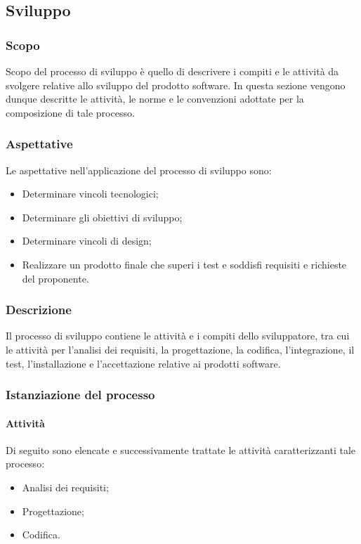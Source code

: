 \vspace{2cm}

\subsection{Sviluppo} \label{subsection:Sviluppo}
\subsubsection{Scopo} \label{subsubsection:Sviluppo_Scopo}
Scopo del processo di sviluppo è quello di descrivere i compiti e le attività da svolgere relative allo sviluppo del prodotto software.
In questa sezione vengono dunque descritte le attività, le norme e le convenzioni adottate per la composizione di tale processo.

\subsubsection{Aspettative} \label{subsubsection:Sviluppo_Aspettative}
Le aspettative nell'applicazione del processo di sviluppo sono:
\begin{itemize}
    \item Determinare vincoli tecnologici;
    \item Determinare gli obiettivi di sviluppo;
    \item Determinare vincoli di design;
    \item Realizzare un prodotto finale che superi i test e soddisfi requisiti e richieste del proponente.
\end{itemize}

\subsubsection{Descrizione} \label{subsubsection:Sviluppo_Descrizione}
Il processo di sviluppo contiene le attività e i compiti dello sviluppatore, tra cui le attività per l'analisi dei requisiti, la progettazione,
la codifica, l'integrazione, il test, l'installazione e l'accettazione relative ai prodotti software.
\subsubsection{Istanziazione del processo}
\paragraph{Attività} \label{subsubsection:Attivita'}
Di seguito sono elencate e successivamente trattate le attività caratterizzanti tale processo:
\begin{itemize}
    \item Analisi dei requisiti;
    \item Progettazione;
    \item Codifica.
\end{itemize}

